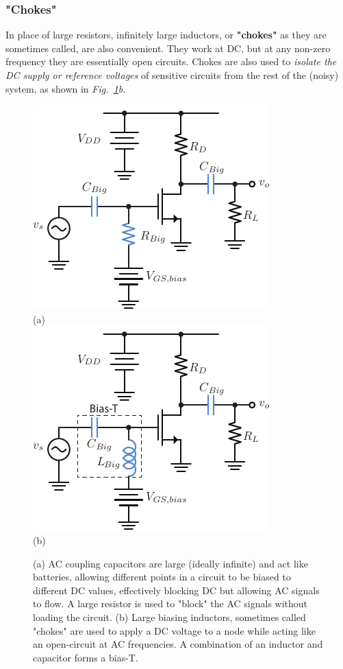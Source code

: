 \subsubsection{"Chokes"}
In place of large resistors, infinitely large inductors, or \textbf{"chokes"} as they are sometimes called, are also convenient.  They work at DC, but at any non-zero frequency they are essentially open circuits.  Chokes are also used to \textit{isolate the DC supply or reference voltages} of sensitive circuits from the rest of the (noisy) system, as shown in \emph{Fig.~\ref{fig:ac_couple}b}.
\begin{figure}[H]
\centering
\includegraphics[width=.55\columnwidth]{csamp_bias}\\
(a)\\[1cm]
\includegraphics[width=.55\columnwidth]{csamp_biasT}\\
(b)\\
\caption{(a) AC coupling capacitors are large (ideally infinite) and act like batteries, allowing different points in a circuit to be biased to different DC values, effectively blocking DC but allowing AC signals to flow.  A large resistor is used to "block" the AC signals without loading the circuit.  (b) Large biasing inductors, sometimes called "chokes" are used to apply a DC voltage to a node while acting like an open-circuit at AC frequencies.  A combination of an inductor and capacitor forms a bias-T.}
\label{fig:ac_couple}
\end{figure}
